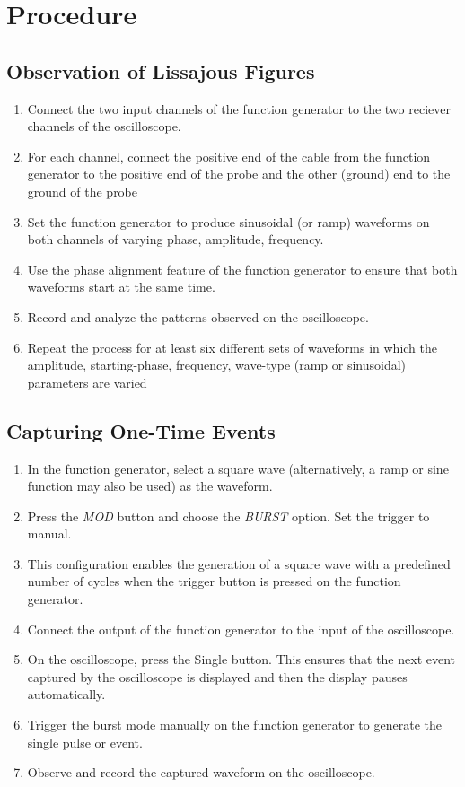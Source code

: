 \documentclass[a4paper,12pt]{article}
\begin{document}
\section*{Procedure}

\subsection*{Observation of Lissajous Figures}
\begin{enumerate}
\item Connect the two input channels of the function generator to the two reciever channels of the oscilloscope.\\
\item For each channel, connect the positive end of the cable from the function generator to the positive end of the probe and the other (ground) end to the ground of the probe\\
\item Set the function generator to produce sinusoidal (or ramp) waveforms on both channels of varying phase, amplitude, frequency.\\
\item Use the phase alignment feature of the function generator to ensure that both waveforms start at the same time.\\
\item Record and analyze the patterns observed on the oscilloscope.\\
\item Repeat the process for at least six different sets of waveforms in which the amplitude, starting-phase, frequency, wave-type (ramp or sinusoidal) parameters are varied\\
\end{enumerate}

\subsection*{Capturing One-Time Events}
\begin{enumerate}
    \item In the function generator, select a square wave (alternatively, a ramp or sine function may also be used) as the waveform.
    \item Press the \textit{MOD} button and choose the \textit{BURST} option. Set the trigger to manual.
    \item This configuration enables the generation of a square wave with a predefined number of cycles when the trigger button is pressed on the function generator.
    \item Connect the output of the function generator to the input of the oscilloscope.
    \item On the oscilloscope, press the Single button. This ensures that the next event captured by the oscilloscope is displayed and then the display pauses automatically.
    \item Trigger the burst mode manually on the function generator to generate the single pulse or event.
    \item Observe and record the captured waveform on the oscilloscope.
\end{enumerate}
\end{document}
